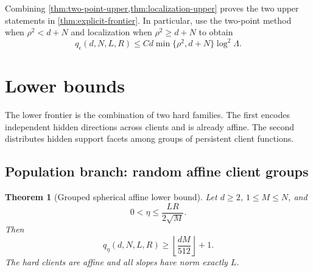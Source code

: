 \documentclass[11pt]{article}
\numberwithin{equation}{section}
\newtheorem{theorem}{Theorem}[section]
\theoremstyle{remark}
\theoremstyle{definition}
\newcommand{\eps}{\epsilon}
\begin{document}
Combining \cref{thm:two-point-upper,thm:localization-upper} proves the two upper statements in \cref{thm:explicit-frontier}.  In particular, use the two-point method when $\rho^2<d+N$ and localization when $\rho^2\ge d+N$ to obtain
\begin{equation}
q_\eps(d,N,L,R)
\le C d\min\{\rho^2,d+N\}\log^2\Lambda.
\label{eq:combined-upper}
\end{equation}

\section{Lower bounds}
\label{sec:lower}

The lower frontier is the combination of two hard families.  The first encodes independent hidden directions across clients and is already affine.  The second distributes hidden support facets among groups of
persistent client functions.

\subsection{Population branch: random affine client groups}

\begin{theorem}[Grouped spherical affine lower bound]
\label{thm:grouped-affine-lower}
Let $d\ge2$, $1\le M\le N$, and
\[
0<\eta\le\frac{LR}{2\sqrt M}.
\]
Then
\[
q_\eta(d,N,L,R)
\ge\left\lfloor\frac{dM}{512}\right\rfloor+1.
\]
The hard clients are affine and all slopes have norm exactly $L$.
\end{theorem}
\end{document}
